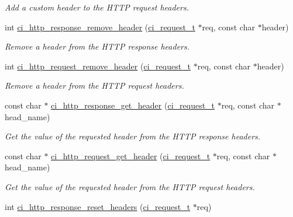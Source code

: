 \begin{DoxyCompactItemize}
\begin{DoxyCompactList}\small\item\em Add a custom header to the HTTP request headers. \item\end{DoxyCompactList}\item 
int \hyperlink{group__HTTP_gaba2bdcc434b345bf0488673e24c0e01c}{ci\_\-http\_\-response\_\-remove\_\-header} (\hyperlink{group__REQUEST_ga27da5c4ae491f527ce36901c2e78ea04}{ci\_\-request\_\-t} $\ast$req, const char $\ast$header)
\begin{DoxyCompactList}\small\item\em Remove a header from the HTTP response headers. \item\end{DoxyCompactList}\item 
int \hyperlink{group__HTTP_ga7ec5f6a8150e6caa316521b60c6511ef}{ci\_\-http\_\-request\_\-remove\_\-header} (\hyperlink{group__REQUEST_ga27da5c4ae491f527ce36901c2e78ea04}{ci\_\-request\_\-t} $\ast$req, const char $\ast$header)
\begin{DoxyCompactList}\small\item\em Remove a header from the HTTP request headers. \item\end{DoxyCompactList}\item 
const char $\ast$ \hyperlink{group__HTTP_ga250fece2ce100062dc38b24e540cf597}{ci\_\-http\_\-response\_\-get\_\-header} (\hyperlink{group__REQUEST_ga27da5c4ae491f527ce36901c2e78ea04}{ci\_\-request\_\-t} $\ast$req, const char $\ast$head\_\-name)
\begin{DoxyCompactList}\small\item\em Get the value of the requested header from the HTTP response headers. \item\end{DoxyCompactList}\item 
const char $\ast$ \hyperlink{group__HTTP_gaff9411231824ac06df9edfe1e36e5ba2}{ci\_\-http\_\-request\_\-get\_\-header} (\hyperlink{group__REQUEST_ga27da5c4ae491f527ce36901c2e78ea04}{ci\_\-request\_\-t} $\ast$req, const char $\ast$head\_\-name)
\begin{DoxyCompactList}\small\item\em Get the value of the requested header from the HTTP request headers. \item\end{DoxyCompactList}\item 
int \hyperlink{group__HTTP_ga2b27cdeba155520463363bf341182dc7}{ci\_\-http\_\-response\_\-reset\_\-headers} (\hyperlink{group__REQUEST_ga27da5c4ae491f527ce36901c2e78ea04}{ci\_\-request\_\-t} $\ast$req)

\end{DoxyCompactItemize}
